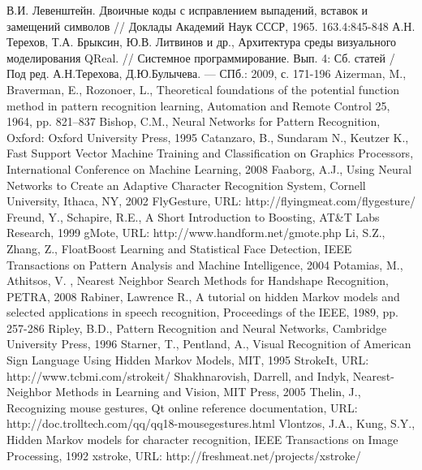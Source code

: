 \documentclass[a5paper]{article}
\begin{document}
\begin{thebibliography}{9001}
   В.И. Левенштейн. Двоичные коды с исправлением выпадений, вставок и замещений символов // Доклады Академий Наук СССР, 1965. 163.4:845-848
   А.Н. Терехов, Т.А. Брыксин, Ю.В. Литвинов и др., Архитектура среды визуального моделирования QReal. // Системное 
программирование. Вып. 4: Сб. статей / Под ред. А.Н.Терехова, Д.Ю.Булычева. --- СПб.: 2009, с. 171-196
   Aizerman, M., Braverman, E., Rozonoer, L., Theoretical foundations of the potential function method in pattern recognition learning, 
Automation and Remote Control 25, 1964, pp. 821–837
   Bishop, C.M., Neural Networks for Pattern Recognition, Oxford: Oxford University Press, 1995  
   Catanzaro, B., Sundaram N., Keutzer K., Fast Support Vector Machine Training and Classification on Graphics Processors, International 
Conference on Machine Learning, 2008
   Faaborg, A.J., Using Neural Networks to Create an Adaptive Character Recognition System, Cornell University, Ithaca, NY, 2002
   FlyGesture, URL: http://flyingmeat.com/flygesture/
   Freund, Y., Schapire, R.E., A Short Introduction to Boosting, AT\&T Labs Research, 1999
   gMote, URL: http://www.handform.net/gmote.php
   Li, S.Z., Zhang, Z., FloatBoost Learning and Statistical Face Detection, IEEE Transactions on Pattern Analysis and Machine Intelligence, 2004
   Potamias, M., Athitsos, V. , Nearest Neighbor Search Methods for Handshape Recognition, PETRA, 2008
   Rabiner, Lawrence R., A tutorial on hidden Markov models and selected applications in speech recognition, Proceedings of the IEEE, 1989, pp. 257-286
   Ripley, B.D., Pattern Recognition and Neural Networks, Cambridge University Press, 1996
   Starner, T., Pentland, A., Visual Recognition of American Sign Language Using Hidden Markov Models, MIT, 1995
   StrokeIt, URL: http://www.tcbmi.com/strokeit/  
   Shakhnarovish, Darrell, and Indyk, Nearest-Neighbor Methods in Learning and Vision, MIT Press, 2005
   Thelin, J., Recognizing mouse gestures, Qt online reference documentation, URL: http://doc.trolltech.com/qq/qq18-mousegestures.html 
   Vlontzos, J.A., Kung, S.Y., Hidden Markov models for character recognition, IEEE Transactions on Image Processing, 1992
   xstroke, URL: http://freshmeat.net/projects/xstroke/
\end{thebibliography}
  
\end{document}
